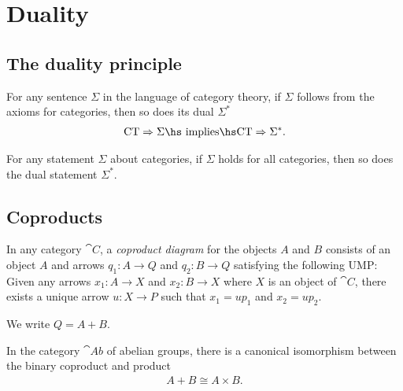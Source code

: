 \documentclass{article}
\begin{document}
\section{Duality}

\subsection{The duality principle}

\begin{proposition}
    For any sentence $\Sigma$ in the language of category theory,
    if $\Sigma$ follows from the axioms for categories, then so does
    its dual $\Sigma^*$
    \begin{align*}
        \text{CT}\Rightarrow \Sigma \text{\hs implies\hs} \text{CT}\Rightarrow \Sigma^*.
    \end{align*}
\end{proposition}

\begin{proposition}
    For any statement $\Sigma$ about categories, if $\Sigma$ holds for all categories,
    then so does the dual statement $\Sigma^*$.
\end{proposition}

\subsection{Coproducts}

\begin{definition}
    In any category $\cat C$, a \emph{coproduct diagram} for the objects $A$ and $B$
    consists of an object $A$ and arrows $q_1:A\to Q$ and $q_2:B\to Q$ satisfying
    the following UMP: Given any arrows $x_1:A\to X$ and $x_2:B\to X$ where $X$ is an
    object of $\cat C$, there exists a unique arrow $u:X\to P$ such that $x_1=up_1$
    and $x_2=up_2$.
    \begin{center}
    \end{center}
    We write $Q=A+B$.
\end{definition}

\begin{proposition}[Awodey 3.11]
    In the category $\cat{Ab}$ of abelian groups, there is a canonical isomorphism between the binary
    coproduct and product
    \begin{align*}
        A + B \cong A \times B.
    \end{align*}
\end{proposition}
\end{document}
